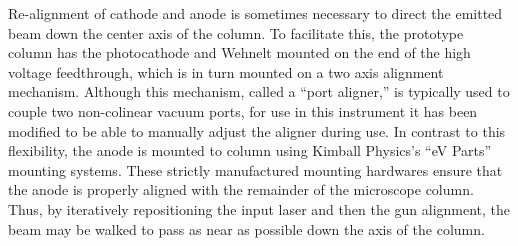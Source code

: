 Re-alignment of cathode and anode is sometimes necessary to direct the emitted beam down the center axis of the column.
To facilitate this, the prototype column has the photocathode and Wehnelt mounted on the end of the high voltage feedthrough, which is in turn mounted on a two axis alignment mechanism.
Although this mechanism, called a ``port aligner,'' is typically used to couple two non-colinear vacuum ports, for use in this instrument it has been modified to be able to manually adjust the aligner during use.
In contrast to this flexibility, the anode is mounted to column using Kimball Physics's ``eV Parts'' mounting systems.
These strictly manufactured mounting hardwares ensure that the anode is properly aligned with the remainder of the microscope column.
Thus, by iteratively repositioning the input laser and then the gun alignment, the beam may be walked to pass as near as possible down the axis of the column.

